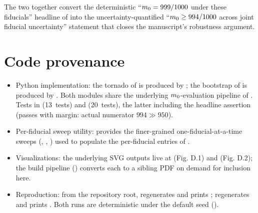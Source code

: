 The two together convert the deterministic
``$m_0 = 999/1000$ under these fiducials'' headline of
 into the uncertainty-quantified
``$m_0 \ge 994/1000$ across joint fiducial uncertainty''
statement that closes the manuscript's robustness argument.

\section{Code provenance}
\label{sec:appx-fiducials-codeanchor}

\begin{itemize}
  \item Python implementation: the tornado of
     is produced by
    ; the bootstrap of
     is produced by
    .  Both modules
    share the underlying $m_0$-evaluation pipeline of
    .
    Tests in  (13~tests) and
     (20~tests), the
    latter including the headline assertion
    (passes with margin: actual numerator $994 \gg 950$).
  \item Per-fiducial sweep utility:
     provides the
    finer-grained one-fiducial-at-a-time sweeps
    (,
    , )
    used to populate the per-fiducial entries of
    .
  \item Visualizations: the underlying SVG outputs live at
     (Fig. D.1)
    and 
    (Fig. D.2); the build pipeline ()
    converts each to a sibling PDF on demand for inclusion here.
  \item Reproduction: from the repository root,
     regenerates
     and prints ;
     regenerates
     and prints
    .  Both runs are deterministic
    under the default seed ().
\end{itemize}
